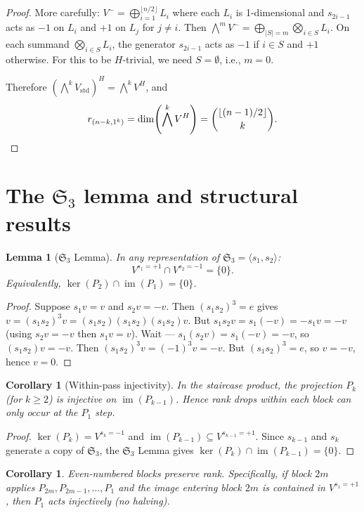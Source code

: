 \documentclass[11pt]{article}
\newtheorem{lemma}[theorem]{Lemma}
\newtheorem{corollary}[theorem]{Corollary}
\theoremstyle{definition}
\theoremstyle{remark}
\newcommand{\Sym}{\mathfrak{S}}
\newcommand{\im}{\operatorname{im}}
\begin{document}
\begin{proof}
More carefully: $V^- = \bigoplus_{i=1}^{\lfloor n/2\rfloor} L_i$ where
each $L_i$ is 1-dimensional and $s_{2i-1}$ acts as $-1$ on $L_i$ and
$+1$ on $L_j$ for $j \ne i$. Then
$\bigwedge^m V^- = \bigoplus_{|S|=m} \bigotimes_{i \in S} L_i$.
On each summand $\bigotimes_{i \in S} L_i$, the generator $s_{2i-1}$
acts as $-1$ if $i \in S$ and $+1$ otherwise. For this to be $H$-trivial,
we need $S = \emptyset$, i.e., $m = 0$.

Therefore $(\bigwedge^k V_{\mathrm{std}})^H = \bigwedge^k V^H$, and
\[
  r_{(n-k,1^k)} = \dim\!\left(\bigwedge^k V^H\right)
    = \binom{\lfloor(n-1)/2\rfloor}{k}. \qedhere
\]
\end{proof}


\section{The $\Sym_3$ lemma and structural results}

\begin{lemma}[$\Sym_3$ Lemma]
\label{lem:S3}
In any representation of $\Sym_3 = \langle s_1, s_2 \rangle$:
\[
  V^{s_1 = +1} \cap V^{s_2 = -1} = \{0\}.
\]
Equivalently, $\ker(P_2) \cap \im(P_1) = \{0\}$.
\end{lemma}

\begin{proof}
Suppose $s_1 v = v$ and $s_2 v = -v$. Then $(s_1 s_2)^3 = e$ gives
$v = (s_1 s_2)^3 v = (s_1 s_2)(s_1 s_2)(s_1 s_2) v$. But
$s_1 s_2 v = s_1(-v) = -s_1 v = -v$ (using $s_2 v = -v$ then $s_1 v = v$).
Wait --- $s_1(s_2 v) = s_1(-v) = -v$, so $(s_1 s_2)v = -v$.
Then $(s_1 s_2)^3 v = (-1)^3 v = -v$. But $(s_1 s_2)^3 = e$, so
$v = -v$, hence $v = 0$.
\end{proof}

\begin{corollary}[Within-pass injectivity]
\label{cor:injectivity}
In the staircase product, the projection $P_k$ (for $k \ge 2$) is
injective on $\im(P_{k-1})$. Hence rank drops within each block can
only occur at the $P_1$ step.
\end{corollary}

\begin{proof}
$\ker(P_k) = V^{s_k = -1}$ and $\im(P_{k-1}) \subseteq V^{s_{k-1} = +1}$.
Since $s_{k-1}$ and $s_k$ generate a copy of $\Sym_3$, the $\Sym_3$ Lemma
gives $\ker(P_k) \cap \im(P_{k-1}) = \{0\}$.
\end{proof}


\begin{corollary}
\label{cor:even-blocks}
Even-numbered blocks preserve rank. Specifically, if block $2m$ applies
$P_{2m}, P_{2m-1}, \ldots, P_1$ and the image entering block $2m$ is
contained in $V^{s_1 = +1}$, then $P_1$ acts injectively (no halving).
\end{corollary}
\end{document}
